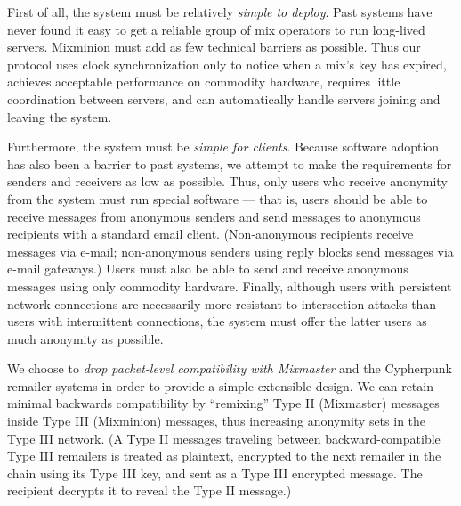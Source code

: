 \documentclass[11pt]{IEEEtran}
\begin{document}

First of all, the system must be relatively \emph{simple to deploy}. 
Past systems have never found it easy to get a reliable group of mix
operators to run long-lived servers. Mixminion must add as few
technical barriers as possible.  Thus our protocol uses clock
synchronization only to notice when a mix's key has expired, achieves
acceptable performance on commodity hardware, requires little
coordination between servers, and can automatically handle servers
joining and leaving the system.

Furthermore, the system must be \emph{simple for clients}.
Because software adoption has also been a barrier to past
systems, we attempt to make the requirements for senders and receivers as low
as possible. Thus, only users who receive anonymity from the system must run
special software --- that is, users should be able to receive messages
from anonymous senders and send messages to anonymous recipients with a
standard email client.  (Non-anonymous recipients receive messages via
e-mail; non-anonymous senders using reply blocks send messages via e-mail gateways.)
Users must also be able to send and receive anonymous messages
using only commodity hardware. Finally, although users with persistent
network connections are necessarily more resistant to intersection
attacks than users with intermittent connections, the system must offer
the latter users as much anonymity as possible.


We choose to \emph{drop packet-level compatibility with Mixmaster} and the
Cypherpunk remailer systems in order to provide a simple extensible
design. We can retain minimal backwards compatibility by ``remixing'' Type II
(Mixmaster) messages inside Type III (Mixminion) messages, thus increasing
anonymity sets in the Type III network. (A Type II messages traveling between
backward-compatible Type III remailers is treated as plaintext, encrypted to
the next remailer in the chain using its Type III key, and sent as a Type III
encrypted message.  The recipient decrypts it to reveal the Type II
message.)
\end{document}
